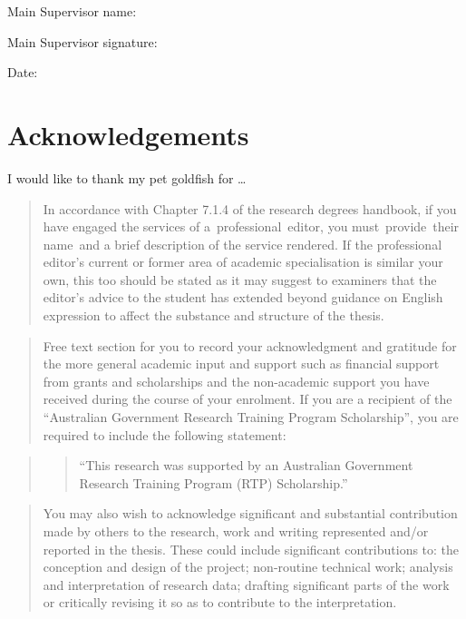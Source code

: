 \documentclass{monashthesis}
\begin{document}
Main Supervisor name:

Main Supervisor signature:

Date:


\hypertarget{acknowledgements}{%
\chapter*{Acknowledgements}\label{acknowledgements}}


I would like to thank my pet goldfish for \ldots{}

\begin{quote}
In accordance with Chapter 7.1.4 of the research degrees handbook, if
you have engaged the services of a~professional~editor, you
must~provide~their name~and a brief description of the service rendered.
If the professional editor's current or former area of academic
specialisation is similar your own, this too should be stated as it may
suggest to examiners that the editor's advice to the student has
extended beyond guidance on English expression to affect the substance
and structure of the thesis.
\end{quote}

\begin{quote}
Free text section for you to record your acknowledgment and gratitude
for the more general academic input and support such as financial
support from grants and scholarships and the non-academic support you
have received during the course of your enrolment. If you are a
recipient of the ``Australian Government Research Training Program
Scholarship'', you are required to include the following statement:
\end{quote}

\begin{quote}
\begin{quote}
``This research was supported by an Australian Government Research
Training Program (RTP) Scholarship.''
\end{quote}
\end{quote}

\begin{quote}
You may also wish to acknowledge significant and substantial
contribution made by others to the research, work and writing
represented and/or reported in the thesis. These could include
significant contributions to: the conception and design of the project;
non-routine technical work; analysis and interpretation of research
data; drafting significant parts of the work or critically revising it
so as to contribute to the interpretation.
\end{quote}
\end{document}
